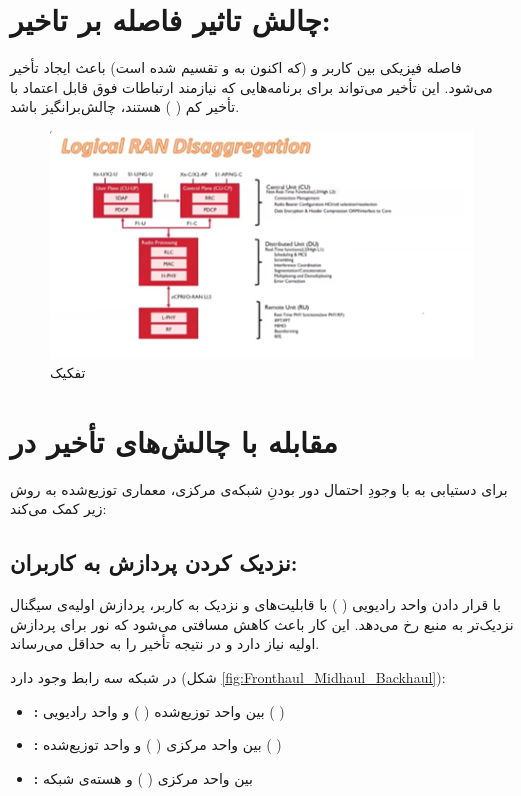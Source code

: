 \documentclass[landscape, 12pt]{report}
\begin{document}
\section*{چالش تاثیر فاصله بر تاخیر: }
فاصله فیزیکی بین کاربر و
(که اکنون به
و
تقسیم شده است) باعث ایجاد تأخیر می‌شود. این تأخیر می‌تواند برای برنامه‌هایی که نیازمند ارتباطات فوق قابل اعتماد با تأخیر کم (
) هستند، چالش‌برانگیز باشد.
\begin{figure}[ht]
	\centering
	\includegraphics[width=.6\linewidth]{Pic/Logical_RAN_Disaggregation}
	\caption{
		تفکیک
	}
	\label{fig:Logical_RAN_Disaggregation}
\end{figure}

\section*{مقابله با چالش‌های تأخیر در
	   }
برای دستیابی به
 با وجودِ احتمال دور بودنِ شبکه‌ی مرکزی، معماری توزیع‌شده به روش زیر کمک می‌کند:
 \subsection*{نزدیک کردن پردازش به کاربران:}
با قرار دادن واحد رادیویی (
) با قابلیت‌های
   و
     نزدیک به کاربر، پردازش اولیه‌ی سیگنال نزدیک‌تر به منبع رخ می‌دهد. این کار باعث کاهش مسافتی می‌شود که نور برای پردازش اولیه نیاز دارد و در نتیجه تأخیر را به حداقل می‌رساند.
     
     
 در شبکه
   سه رابط وجود دارد (شکل \ref{fig:Fronthaul_Midhaul_Backhaul}):
   \begin{itemize}
   	\item \textbf{:}
   	  بین واحد توزیع‌شده (
   	  ) و واحد رادیویی (
   	  )
   	\item \textbf{:}
   	بین واحد مرکزی (
   	) و واحد توزیع‌شده (
   	)
   	\item \textbf{:}
   	بین واحد مرکزی (
   	) و هسته‌ی شبکه
   \end{itemize}
     
\end{document}
